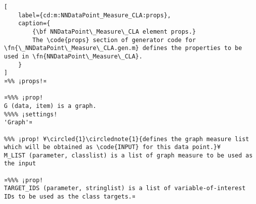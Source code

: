\documentclass{tufte-handout}
\begin{document}
\begin{lstlisting}[
	label={cd:m:NNDataPoint_Measure_CLA:props},
	caption={
		{\bf NNDataPoint\_Measure\_CLA element props.}
		The \code{props} section of generator code for \fn{\_NNDataPoint\_Measure\_CLA.gen.m} defines the properties to be used in \fn{NNDataPoint\_Measure\_CLA}.
	}
]
¤%% ¡props!¤

¤%%% ¡prop!  
G (data, item) is a graph.
%%%% ¡settings!
'Graph'¤

%%% ¡prop! ¥\circled{1}\circlednote{1}{defines the graph measure list which will be obtained as \code{INPUT} for this data point.}¥
M_LIST (parameter, classlist) is a list of graph measure to be used as the input

¤%%% ¡prop!
TARGET_IDS (parameter, stringlist) is a list of variable-of-interest IDs to be used as the class targets.¤

\end{lstlisting}

\clearpage
\end{document}
